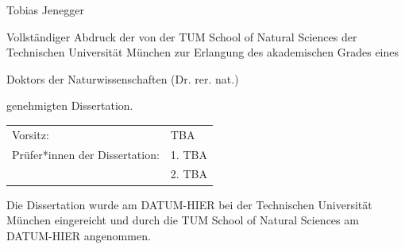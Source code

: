 \documentclass[12pt,twoside]{article}
\begin{document}
\begin{titlepage}
{  %
  
  {Tobias Jenegger}
  
  \vspace*{2\baselineskip} %

	Vollst\"andiger Abdruck der von der TUM School of Natural Sciences der Technischen
	Universit\"at M\"unchen zur Erlangung des akademischen Grades eines

	\vspace*{2ex}
	Doktors der Naturwissenschaften (Dr. rer. nat.)
	\vspace*{2ex}

	genehmigten Dissertation.

  \vspace*{\fill}

% 
% 
% 

  	\begin{tabularx}{1.0\textwidth}{XX}
	Vorsitz:	&	TBA \\
	Pr\"ufer*innen der Dissertation:	&	1. TBA \\
							        &	2. TBA \\
							
	\end{tabularx}


	\vspace*{\fill}

	Die Dissertation wurde am DATUM-HIER bei der Technischen Universit\"at M\"unchen
	eingereicht und durch die TUM School of Natural Sciences am DATUM-HIER angenommen.

  \vspace*{\fill}

  \null
  \vfill

}
\end{titlepage}
\end{document}

